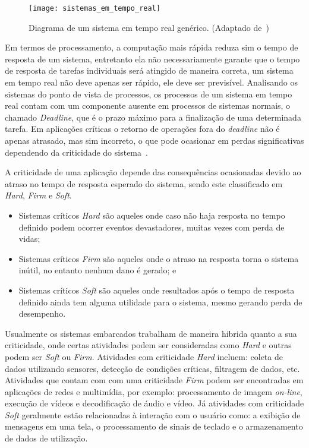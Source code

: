 \begin{figure}[h]
	\texttt{[image: sistemas\_em\_tempo\_real]}
    \centering
    \caption{Diagrama de um sistema em tempo real genérico. (Adaptado de~)}
    \label{fig:rt}
\end{figure}

Em termos de processamento, a computação mais rápida reduza sim o tempo de resposta de um sistema, entretanto ela não necessariamente garante que o tempo de resposta de tarefas individuais será atingido de maneira correta, um sistema em tempo real não deve apenas ser rápido, ele deve ser previsível.
% 
Analisando os sistemas do ponto de vista de processos, os processos de um sistema em tempo real contam com um componente ausente em processos de sistemas normais, o chamado \textit{Deadline}, que é o prazo máximo para a finalização de uma determinada tarefa. Em aplicações críticas o retorno de operações fora do \textit{deadline} não é apenas atrasado, mas sim incorreto, o que pode ocasionar em perdas significativas dependendo da criticidade do sistema~\cite{BUTTAZZO:2011}.


A criticidade de uma aplicação depende das consequências ocasionadas devido ao atraso no tempo de resposta esperado do sistema, sendo este classificado em \textit{Hard}, \textit{Firm} e \textit{Soft}.
\begin{itemize}
\item Sistemas críticos \textit{Hard} são aqueles onde caso não haja resposta no tempo definido podem ocorrer eventos devastadores, muitas vezes com perda de vidas;
\item Sistemas críticos \textit{Firm} são aqueles onde o atraso na resposta torna o sistema inútil, no entanto nenhum dano é gerado; e
\item Sistemas críticos \textit{Soft} são aqueles onde resultados após o tempo de resposta definido ainda tem alguma utilidade para o sistema, mesmo gerando perda de desempenho.
\end{itemize}


Usualmente os sistemas embarcados trabalham de maneira hibrida quanto a sua criticidade, onde certas atividades podem ser consideradas como \textit{Hard} e outras podem ser \textit{Soft} ou \textit{Firm}. Atividades com criticidade \textit{Hard} incluem: coleta de dados utilizando sensores, detecção de condições críticas, filtragem de dados, etc. Atividades que contam com com uma criticidade \textit{Firm} podem ser encontradas em aplicações de redes e multimídia, por exemplo: processamento de imagem \textit{on-line}, execução de vídeos e decodificação de áudio e vídeo. Já atividades com criticidade \textit{Soft} geralmente estão relacionadas à interação com o usuário como: a exibição de mensagens em uma tela, o processamento de sinais de teclado e o armazenamento de dados de utilização. \cite{BUTTAZZO:2011}

